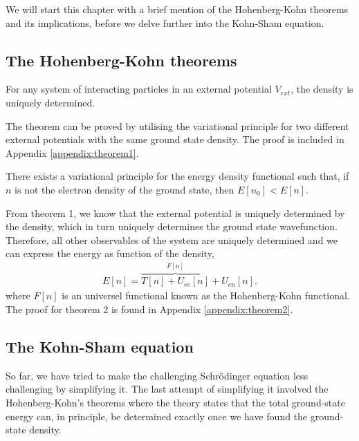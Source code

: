 We will start this chapter with a brief mention of the Hohenberg-Kohn theorems and its implications, before we delve further into the Kohn-Sham equation.

\subsection{The Hohenberg-Kohn theorems}

\begin{theorem}
  For any system of interacting particles in an external potential $V_{ext}$, the density is uniquely determined.
\end{theorem}

The theorem can be proved by utilising the variational principle for two different external potentials with the same ground state density.
The proof is included in Appendix \ref{appendix:theorem1}.

\begin{theorem}
  There exists a variational principle for the energy density functional such that, if $n$ is not the electron density of the ground state, then $E\left[ n_0 \right] < E\left[ n \right]$.
\end{theorem}

From theorem 1, we know that the external potential is uniquely determined by the density, which in turn uniquely determines the ground state wavefunction. Therefore, all other observables of the system are uniquely determined and we can express the energy as function of the density,
\begin{align}
  E[n] = \overbrace{T[n] + U_{ee}[n]}^{F[n]} + U_{en}[n].
  \label{eq:densityfunctional}
\end{align}
where $F[n]$ is an universel functional known as the Hohenberg-Kohn functional. The proof for theorem 2 is found in Appendix \ref{appendix:theorem2}.

\subsection{The Kohn-Sham equation}
So far, we have tried to make the challenging Schrödinger equation less challenging by simplifying it. The last attempt of simplifying it involved the Hohenberg-Kohn's theorems where the theory states that the total ground-state energy can, in principle, be determined exactly once we have found the ground-state density.

